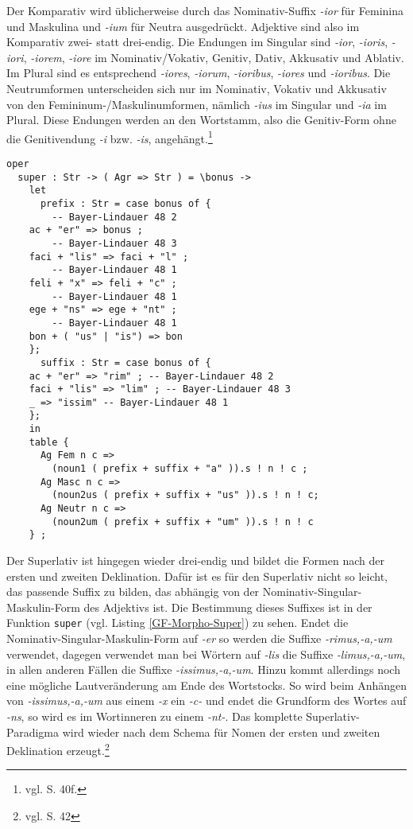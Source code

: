 Der Komparativ wird üblicherweise durch das No\-mi\-na\-tiv-Suffix \textit{-ior} für Feminina und Maskulina und \textit{-ium} für Neutra ausgedrückt. Adjektive sind also im Komparativ zwei- statt drei-endig. Die Endungen im Singular sind \textit{-ior}, \textit{-ioris}, \textit{-iori}, \textit{-iorem}, \textit{-iore} im Nominativ/Vokativ, Genitiv, Dativ, Akkusativ und Ablativ. Im Plural sind es entsprechend \textit{-iores}, \textit{-iorum}, \textit{-ioribus}, \textit{-iores} und \textit{-ioribus}. Die Neutrumformen unterscheiden sich nur im Nominativ, Vokativ und Akkusativ von den Femininum-/Maskulinumformen, nämlich \textit{-ius} im Singular und \textit{-ia} im Plural. Diese Endungen werden an den Wortstamm, also die Genitiv-Form ohne die Genitivendung \textit{-i} bzw. \textit{-is}, angehängt.\footnote{vgl. \cite{BAYER-LINDAUER1994} S. 40f.} \par
\begin{lstlisting}[float=h!tp,caption={Erzeugung der Superlativ-Formen eines Adjektivs (vgl. \textbf{MorphoLat.gf})},label={GF-Morpho-Super},basicstyle=\small]
oper
  super : Str -> ( Agr => Str ) = \bonus ->
    let
      prefix : Str = case bonus of {
        -- Bayer-Lindauer 48 2
	ac + "er" => bonus ; 
        -- Bayer-Lindauer 48 3
	faci + "lis" => faci + "l" ;
        -- Bayer-Lindauer 48 1 
	feli + "x" => feli + "c" ; 
        -- Bayer-Lindauer 48 1
	ege + "ns" => ege + "nt" ; 
        -- Bayer-Lindauer 48 1
	bon + ( "us" | "is") => bon 
	};
      suffix : Str = case bonus of {
	ac + "er" => "rim" ; -- Bayer-Lindauer 48 2
	faci + "lis" => "lim" ; -- Bayer-Lindauer 48 3
	_ => "issim" -- Bayer-Lindauer 48 1
	};
    in
    table {
      Ag Fem n c => 
        (noun1 ( prefix + suffix + "a" )).s ! n ! c ;
      Ag Masc n c => 
        (noun2us ( prefix + suffix + "us" )).s ! n ! c;
      Ag Neutr n c => 
        (noun2um ( prefix + suffix + "um" )).s ! n ! c
    } ;
\end{lstlisting}
Der Superlativ ist hingegen wieder drei-endig und bildet die Formen nach der ersten und zweiten Deklination. Dafür ist es für den Superlativ nicht so leicht, das passende Suffix zu bilden, das abhängig von der Nominativ-Singular-Maskulin-Form des Adjektivs ist. Die Bestimmung dieses Suffixes ist in der Funktion \texttt{super} (vgl. Listing \ref{GF-Morpho-Super}) zu sehen. Endet die Nominativ-Singular-Maskulin-Form auf \textit{-er} so werden die Suffixe \textit{-rimus,-a,-um} verwendet, dagegen verwendet man bei Wörtern auf \textit{-lis} die Suffixe \textit{-limus,-a,-um}, in allen anderen Fällen die Suffixe \textit{-issimus,-a,-um}. Hinzu kommt allerdings noch eine mögliche Lautveränderung am Ende des Wortstocks. So wird beim Anhängen von \textit{-issimus,-a,-um} aus einem \textit{-x} ein \textit{-c-} und endet die Grundform des Wortes auf \textit{-ns}, so wird es im Wortinneren zu einem \textit{-nt-}. Das komplette Superlativ-Paradigma wird wieder nach dem Schema für Nomen der ersten und zweiten Deklination erzeugt.\footnote{vgl. \cite{BAYER-LINDAUER1994} S. 42} \par
